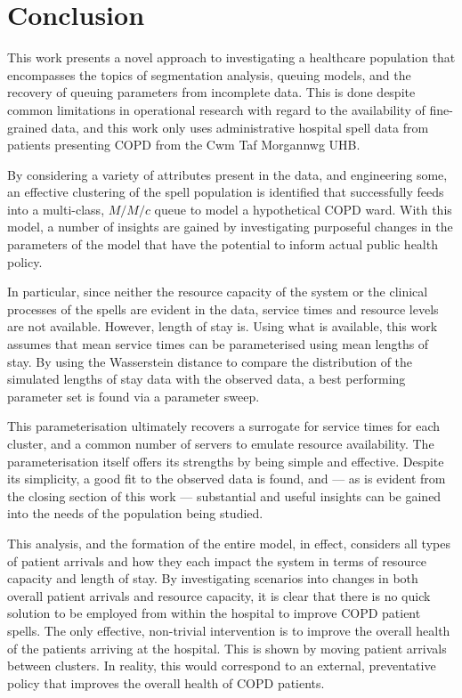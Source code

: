 \section{Conclusion}\label{sec:conclusion}

This work presents a novel approach to investigating a healthcare population
that encompasses the topics of segmentation analysis, queuing models, and the
recovery of queuing parameters from incomplete data. This is done despite common
limitations in operational research with regard to the availability of
fine-grained data, and this work only uses administrative hospital spell data
from patients presenting COPD from the Cwm Taf Morgannwg UHB.\

By considering a variety of attributes present in the data, and engineering
some, an effective clustering of the spell population is identified that
successfully feeds into a multi-class, \(M/M/c\) queue to model a hypothetical
COPD ward. With this model, a number of insights are gained by investigating
purposeful changes in the parameters of the model that have the potential to
inform actual public health policy.

In particular, since neither the resource capacity of the system or the clinical
processes of the spells are evident in the data, service times and resource
levels are not available. However, length of stay is. Using what is available,
this work assumes that mean service times can be parameterised using mean
lengths of stay. By using the Wasserstein distance to compare the distribution
of the simulated lengths of stay data with the observed data, a best performing
parameter set is found via a parameter sweep.

This parameterisation ultimately recovers a surrogate for service times for each
cluster, and a common number of servers to emulate resource availability. The
parameterisation itself offers its strengths by being simple and effective.
Despite its simplicity, a good fit to the observed data is found, and --- as is
evident from the closing section of this work --- substantial and useful
insights can be gained into the needs of the population being studied.

This analysis, and the formation of the entire model, in effect, considers all
types of patient arrivals and how they each impact the system in terms of
resource capacity and length of stay. By investigating scenarios into changes in
both overall patient arrivals and resource capacity, it is clear that there is
no quick solution to be employed from within the hospital to improve COPD
patient spells.  The only effective, non-trivial intervention is to improve the
overall health of the patients arriving at the hospital. This is shown by moving
patient arrivals between clusters. In reality, this would correspond to an
external, preventative policy that improves the overall health of COPD patients.
